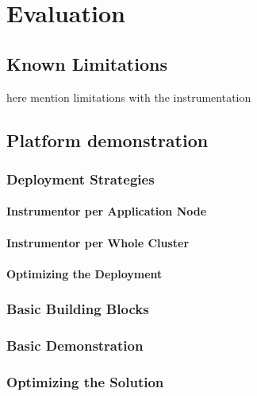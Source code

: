\chapter{Evaluation}
\label{chap:evaluation}
\section{Known Limitations}
here mention limitations with the instrumentation

\section{Platform demonstration}
\subsection{Deployment Strategies}
\subsubsection{Instrumentor per Application Node}
\subsubsection{Instrumentor per Whole Cluster}
\subsubsection{Optimizing the Deployment}
\subsection{Basic Building Blocks}
\subsection{Basic Demonstration}
\subsection{Optimizing the Solution}